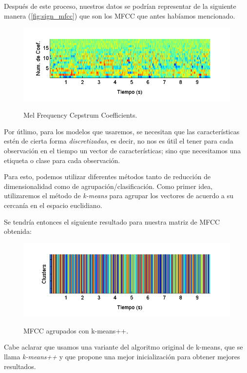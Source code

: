 Después de este proceso, nuestros datos se podrían representar de la siguiente manera (\autoref{fig:sign_mfcc}) que son los MFCC que antes habíamos mencionado.
\begin{figure}[bth]
  \myfloatalign
  {\includegraphics[width=0.9\linewidth]{gfx/chap5/signal-mfcc}} \quad
  \caption{Mel Frequency Cepstrum Coefficients.}
  \label{fig:sign_mfcc}
\end{figure}

Por útlimo, para los modelos que usaremos, se necesitan que las características estén de cierta forma \textit{discretizadas}, es decir, no nos es útil el tener para cada observación en el tiempo un vector de características; sino que necesitamos una etiqueta o clase para cada observación. 

Para esto, podemos utilizar diferentes métodos tanto de reducción de dimensionalidad como de agrupación/clasificación. Como primer idea, utilizaremos el método de \textit{k-means} para agrupar los vectores de acuerdo a su cercanía en el espacio euclidiano.

Se tendría entonces el siguiente resultado para nuestra matriz de MFCC obtenida:
\begin{figure}[bth]
  {\includegraphics[width=0.9\linewidth]{gfx/chap5/signal-clusters}} \quad
  \caption{MFCC agrupados con k-means++.}
  \label{fig:sign_clusters}
\end{figure}
Cabe aclarar que usamos una variante del algoritmo original de k-means, que se llama \textit{k-means++} y que propone una mejor inicialización para obtener mejores resultados.

